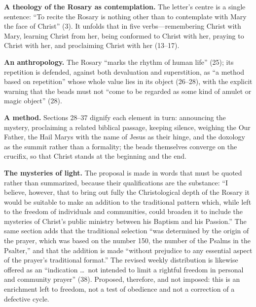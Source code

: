\textbf{A theology of the Rosary as contemplation.} The letter's centre
is a single sentence: ``To recite the Rosary is nothing other than to
contemplate with Mary the face of Christ'' (3). It unfolds that in five
verbs---remembering Christ with Mary, learning Christ from her, being
conformed to Christ with her, praying to Christ with her, and
proclaiming Christ with her (13--17).

\textbf{An anthropology.} The Rosary ``marks the rhythm of human life''
(25); its repetition is defended, against both devaluation and
superstition, as ``a method based on repetition'' whose whole value lies
in its object (26--28), with the explicit warning that the beads must
not ``come to be regarded as some kind of amulet or magic object'' (28).

\textbf{A method.} Sections 28--37 dignify each element in turn:
announcing the mystery, proclaiming a related biblical passage, keeping
silence, weighing the Our Father, the Hail Marys with the name of Jesus
as their hinge, and the doxology as the summit rather than a formality;
the beads themselves converge on the crucifix, so that Christ stands at
the beginning and the end.

\textbf{The mysteries of light.} The proposal is made in words that must
be quoted rather than summarized, because their qualifications are the
substance: ``I believe, however, that to bring out fully the
Christological depth of the Rosary it would be suitable to make an
addition to the traditional pattern which, while left to the freedom of
individuals and communities, could broaden it to include the mysteries
of Christ's public ministry between his Baptism and his Passion.'' The
same section adds that the traditional selection ``was determined by the
origin of the prayer, which was based on the number 150, the number of
the Psalms in the Psalter,'' and that the addition is made ``without
prejudice to any essential aspect of the prayer's traditional format.''
The revised weekly distribution is likewise offered as an ``indication
\ldots\ not intended to limit a rightful freedom in personal and
community prayer'' (38). Proposed, therefore, and not imposed: this is
an enrichment left to freedom, not a test of obedience and not a
correction of a defective cycle.

